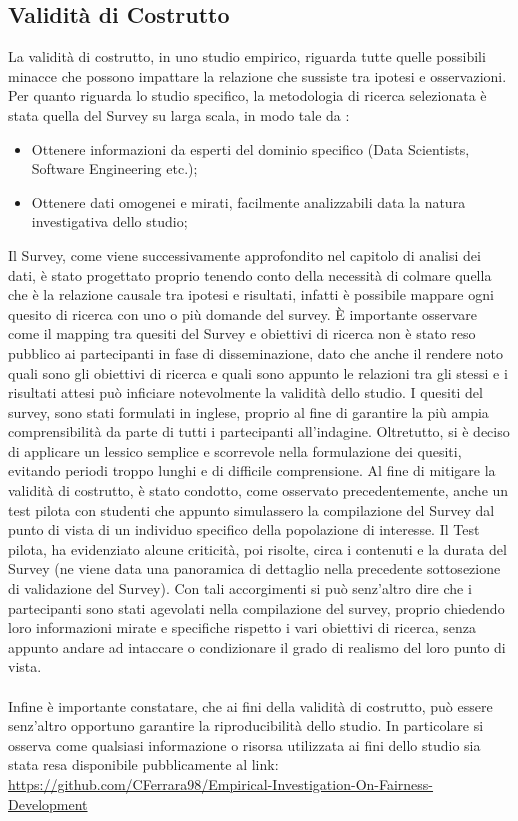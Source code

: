 \subsection{Validità di Costrutto}
La validità di costrutto, in uno studio empirico, riguarda tutte quelle possibili minacce che possono impattare la relazione che sussiste tra ipotesi e osservazioni. Per quanto riguarda lo studio specifico, la metodologia di ricerca selezionata è stata quella del Survey su larga scala, in modo tale da :

\begin{itemize}
    \item Ottenere informazioni da esperti del dominio specifico (Data Scientists, Software Engineering etc.);
    \item Ottenere dati omogenei e mirati, facilmente analizzabili data la natura investigativa dello studio;
\end{itemize}

Il Survey, come viene successivamente approfondito nel capitolo di analisi dei dati, è stato progettato proprio tenendo conto della necessità di colmare quella che è la relazione causale tra ipotesi e risultati, infatti è possibile mappare ogni quesito di ricerca con uno o più domande del survey. È importante osservare come il mapping tra quesiti del Survey e obiettivi di ricerca non è stato reso pubblico ai partecipanti in fase di disseminazione, dato che anche il rendere noto quali sono gli obiettivi di ricerca e quali sono appunto le relazioni tra gli stessi e i risultati attesi può inficiare notevolmente la validità dello studio.  I quesiti del survey, sono stati formulati in inglese, proprio al fine di garantire la più ampia comprensibilità da parte di tutti i partecipanti all'indagine. Oltretutto, si è deciso di applicare un lessico semplice e scorrevole nella formulazione dei quesiti, evitando periodi troppo lunghi e di difficile comprensione. Al fine di mitigare la validità di costrutto, è stato condotto, come osservato precedentemente, anche un test pilota con studenti che appunto simulassero la compilazione del Survey dal punto di vista di un individuo specifico della popolazione di interesse. Il Test pilota, ha evidenziato alcune criticità, poi risolte, circa i contenuti e la durata del Survey (ne viene data una panoramica di dettaglio nella precedente sottosezione di validazione del Survey). Con tali accorgimenti si può senz'altro dire che i partecipanti sono stati agevolati nella compilazione del survey, proprio chiedendo loro informazioni mirate e specifiche rispetto i vari obiettivi di ricerca, senza appunto andare ad intaccare o condizionare il grado di realismo del loro punto di vista. \\ \\
Infine è importante constatare, che ai fini della validità di costrutto, può essere senz'altro opportuno garantire la riproducibilità dello studio. In particolare si osserva come qualsiasi informazione o risorsa utilizzata ai fini dello studio sia stata resa disponibile pubblicamente al link: \url{https://github.com/CFerrara98/Empirical-Investigation-On-Fairness-Development}

